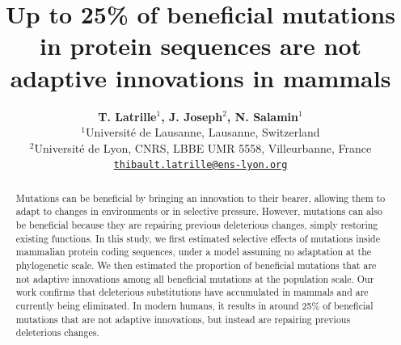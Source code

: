\documentclass{article}
\title{Up to 25\% of beneficial mutations in protein sequences are not adaptive innovations in mammals}
\author{
    \large
    \textbf{T. {Latrille}$^{1}$, J. {Joseph}$^{2}$, N. {Salamin}$^{1}$}\\
    \normalsize
    $^{1}$Université de Lausanne, Lausanne, Switzerland\\
    $^{2}$Université de Lyon, CNRS, LBBE UMR 5558, Villeurbanne, France \\
    \texttt{\href{mailto:thibault.latrille@ens-lyon.org}{thibault.latrille@ens-lyon.org}} \\
}
\begin{document}
    \maketitle

    \begin{abstract}
        Mutations can be beneficial by bringing an innovation to their bearer, allowing them to adapt to changes in environments or in selective pressure.
        However, mutations can also be beneficial because they are repairing previous deleterious changes, simply restoring existing functions.
        In this study, we first estimated selective effects of mutations inside mammalian protein coding sequences, under a model assuming no adaptation at the phylogenetic scale.
        We then estimated the proportion of beneficial mutations that are not adaptive innovations among all beneficial mutations at the population scale.
        Our work confirms that deleterious substitutions have accumulated in mammals and are currently being eliminated.
        In modern humans, it results in around 25\% of beneficial mutations that are not adaptive innovations, but instead are repairing previous deleterious changes.
    \end{abstract}

\end{document}
